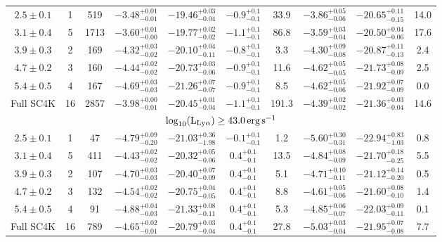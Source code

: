 \documentclass[a4paper,fleqn,usenatbib]{mnras}
\begin{document}
\begin{table*}
\begin{tabular}{ccc | cccc | ccc}
\hline
$2.5\pm0.1$ & 1 & 519 & $-3.48^{+0.01}_{-0.01}$ & $-19.46^{+0.03}_{-0.04}$ & $-0.9^{+0.1}_{-0.1}$ & 33.9 & $-3.86^{+0.05}_{-0.06}$ & $-20.65^{+0.11}_{-0.15}$ & 14.0 \\
$3.1\pm0.4$ & 5 & 1713 & $-3.60^{+0.01}_{-0.00}$ & $-19.77^{+0.02}_{-0.02}$ & $-1.1^{+0.1}_{-0.1}$ & 86.8 & $-3.59^{+0.03}_{-0.04}$ & $-20.50^{+0.04}_{-0.06}$ & 17.6 \\
$3.9\pm0.3$ & 2 & 169 & $-4.32^{+0.03}_{-0.02}$ & $-20.10^{+0.04}_{-0.11}$ & $-0.8^{+0.1}_{-0.1}$ & 3.3 & $-4.30^{+0.09}_{-0.08}$ & $-20.87^{+0.11}_{-0.13}$ & 2.4 \\
$4.7\pm0.2$ & 3 & 160 & $-4.44^{+0.02}_{-0.02}$ & $-20.73^{+0.03}_{-0.06}$ & $-0.9^{+0.1}_{-0.1}$ & 11.6 & $-4.62^{+0.05}_{-0.05}$ & $-21.73^{+0.08}_{-0.09}$ & 2.5 \\
$5.4\pm0.5$ & 4 & 167 & $-4.69^{+0.03}_{-0.03}$ & $-21.26^{+0.07}_{-0.07}$ & $-0.9^{+0.1}_{-0.1}$ & 8.5 & $-4.62^{+0.05}_{-0.06}$ & $-21.92^{+0.07}_{-0.09}$ & 0.0 \\
Full SC4K & 16 & 2857 & $-3.98^{+0.00}_{-0.01}$ & $-20.45^{+0.01}_{-0.04}$ & $-1.1^{+0.1}_{-0.1}$ & 191.3 & $-4.39^{+0.02}_{-0.02}$ & $-21.36^{+0.03}_{-0.04}$ & 14.6 \\
\hline
\multicolumn{10}{c|}{$\log_{10} (\rm L_{Ly\alpha}) \geq 43.0\,erg\,s^{-1}$} \\
\hline
$2.5\pm0.1$ & 1 & 47 & $-4.79^{+0.09}_{-0.20}$ & $-21.03^{+0.36}_{-1.98}$ & $-0.1^{+0.1}_{-0.1}$ & 1.2 & $-5.60^{+0.30}_{-0.31}$ & $-22.94^{+0.83}_{-1.03}$ & 0.8 \\
$3.1\pm0.4$ & 5 & 411 & $-4.43^{+0.02}_{-0.02}$ & $-20.32^{+0.05}_{-0.06}$ & $0.4^{+0.1}_{-0.1}$ & 13.5 & $-4.84^{+0.08}_{-0.09}$ & $-21.70^{+0.18}_{-0.25}$ & 5.5 \\
$3.9\pm0.3$ & 2 & 107 & $-4.70^{+0.03}_{-0.03}$ & $-20.40^{+0.07}_{-0.09}$ & $0.4^{+0.1}_{-0.1}$ & 5.1 & $-4.71^{+0.10}_{-0.11}$ & $-21.12^{+0.14}_{-0.20}$ & 0.5 \\
$4.7\pm0.2$ & 3 & 132 & $-4.54^{+0.02}_{-0.02}$ & $-20.75^{+0.04}_{-0.05}$ & $0.4^{+0.1}_{-0.1}$ & 8.8 & $-4.61^{+0.05}_{-0.06}$ & $-21.60^{+0.08}_{-0.10}$ & 1.4 \\
$5.4\pm0.5$ & 4 & 91 & $-4.88^{+0.04}_{-0.03}$ & $-21.33^{+0.08}_{-0.11}$ & $0.4^{+0.1}_{-0.1}$ & 5.3 & $-4.85^{+0.06}_{-0.07}$ & $-22.03^{+0.09}_{-0.11}$ & 0.1 \\
Full SC4K & 16 & 789 & $-4.65^{+0.02}_{-0.01}$ & $-20.79^{+0.03}_{-0.04}$ & $0.4^{+0.1}_{-0.1}$ & 27.8 & $-5.03^{+0.03}_{-0.04}$ & $-21.95^{+0.07}_{-0.08}$ & 7.7 \\
\hline
\end{tabular}
\end{table*}
\end{document}
